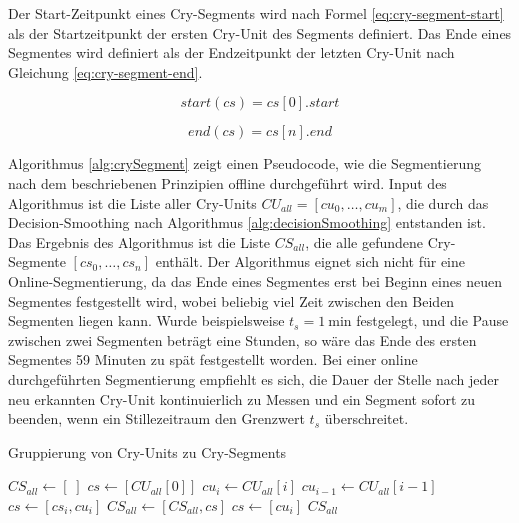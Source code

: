 Der Start-Zeitpunkt eines Cry-Segments wird nach Formel \ref{eq:cry-segment-start} als der Startzeitpunkt der ersten Cry-Unit des Segments definiert. Das Ende eines Segmentes wird definiert als der Endzeitpunkt der letzten Cry-Unit nach Gleichung \ref{eq:cry-segment-end}.

\begin{equation}
start(cs) = cs[0].start
\label{eq:cry-segment-start}
\end{equation}

\begin{equation}
end(cs) = cs[n].end
\label{eq:cry-segment-end}
\end{equation}

Algorithmus \ref{alg:crySegment} zeigt einen Pseudocode, wie die Segmentierung nach dem beschriebenen Prinzipien offline durchgeführt wird. Input des Algorithmus ist die Liste aller Cry-Units $CU_{all} = [cu_0 ,\ldots, cu_m]$, die durch das Decision-Smoothing nach Algorithmus \ref{alg:decisionSmoothing} entstanden ist. Das Ergebnis des Algorithmus ist die Liste $CS_{all}$, die alle gefundene Cry-Segmente  $[cs_0 , \ldots ,  cs_n]$ enthält. Der Algorithmus eignet sich nicht für eine Online-Segmentierung, da das Ende eines Segmentes erst bei Beginn eines neuen Segmentes festgestellt wird, wobei beliebig viel Zeit zwischen den Beiden Segmenten liegen kann. Wurde beispielsweise $t_{s} = \SI{1}{\minute}$ festgelegt, und die Pause zwischen zwei Segmenten beträgt eine Stunden, so wäre das Ende des ersten Segmentes 59 Minuten zu spät festgestellt worden. Bei einer online durchgeführten Segmentierung empfiehlt es sich, die Dauer der Stelle nach jeder neu erkannten Cry-Unit kontinuierlich zu Messen und ein Segment sofort zu beenden, wenn ein Stillezeitraum den Grenzwert $t_s$ überschreitet.

\begin{algorithm}[h]
	\caption{Gruppierung von Cry-Units zu Cry-Segments}
	\label{alg:crySegment}
	\begin{algorithmic}[1]
		\State $ CS_{all} \gets [\;]$
		\State $ cs \gets [CU_{all}[0]]$
						\State $ cu_i \gets CU_{all}[i]$
						\State $cu_{i-1} \gets CU_{all}[i-1]$
								\State $cs \gets [cs_i , cu_i]$
						\Else
								\State $CS_{all} \gets [CS_{all}, cs]$
								\State $cs \gets [cu_i]$
						\EndIf
				\EndFor
		\Return $CS_{all}$
		
		\EndFunction
		
	\end{algorithmic}
\end{algorithm}

